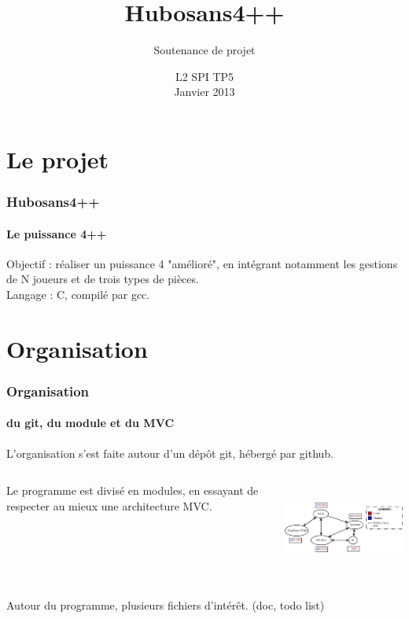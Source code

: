\documentclass{beamer}
\title{Hubosans4++}
\subtitle{Soutenance de projet}
\author{}
\date{L2 SPI TP5\\ Janvier 2013}
\begin{document}
    \frame{\titlepage}


    \begin{frame}
        \tableofcontents[]
    \end{frame}      



    \section{Le projet}
    \begin{frame}
    \frametitle{Hubosans4++}
    \framesubtitle{Le puissance 4++}
        Objectif : réaliser un puissance 4 "amélioré", 
            en intégrant notamment les gestions de N joueurs 
            et de trois types de pièces. \\     
        \vspace{2cm} %
        Langage : C, compilé par gcc. \\
    \end{frame}



    \section{Organisation}
    \begin{frame}
    \frametitle{Organisation}
    \framesubtitle{du git, du module et du MVC}
        L'organisation s'est faite autour d'un dépôt git, 
            hébergé par github.  
        \vspace{1cm} %
        \begin{columns}[c] %
            \begin{column}{5cm} %
                Le programme est divisé en modules, en essayant 
                    de respecter au mieux une architecture MVC. 
            \end{column}
            \begin{column}{7cm} %
                \includegraphics[width=7cm, height=3cm]{ressources/presentation/archi_projet.jpeg}
            \end{column}
        \end{columns}
        \vspace{1cm} %
        Autour du programme, plusieurs fichiers d'intérêt.
            (doc, todo list)
    \end{frame}
\end{document}
